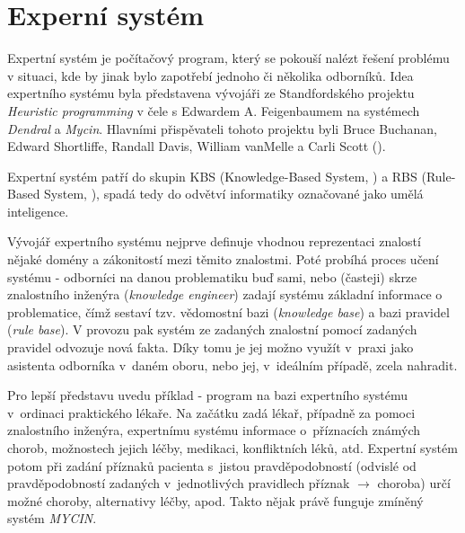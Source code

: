 \section{Experní systém}
Expertní systém je počítačový program, který se pokouší nalézt řešení problému
v situaci, kde by jinak bylo zapotřebí jednoho či několika odborníků.
Idea expertního systému byla představena vývojáři ze Standfordského projektu
\emph{Heuristic programming} v čele s Edwardem A. Feigenbaumem na systémech
\emph{Dendral} a \emph{Mycin}. Hlavními přispěvateli tohoto projektu byli
Bruce Buchanan, Edward Shortliffe, Randall Davis, William vanMelle a Carli
Scott (\cite{expert-system}).

Expertní systém patří do skupin KBS (Knowledge-Based System, ) a RBS (Rule-Based System, ), spadá tedy do odvětví informatiky označované jako umělá
inteligence.

Vývojář expertního systému nejprve definuje vhodnou reprezentaci znalostí nějaké
domény a zákonitostí mezi těmito znalostmi. Poté probíhá proces učení systému -
odborníci na danou problematiku buď sami, nebo (časteji) skrze znalostního
inženýra (\emph{knowledge engineer}) zadají systému základní informace
o problematice, čímž sestaví tzv. vědomostní bazi (\emph{knowledge base})
a bazi pravidel (\emph{rule base}). V provozu pak systém ze zadaných znalostní
pomocí zadaných pravidel odvozuje nová fakta. Díky tomu je jej možno využít
v~praxi jako asistenta odborníka v~daném oboru, nebo jej, v~ideálním případě,
zcela nahradit.

Pro lepší představu uvedu příklad - program na bazi expertního systému
v~ordinaci praktického lékaře. Na začátku zadá lékař, případně za pomoci
znalostního inženýra, expertnímu systému informace o~příznacích známých chorob,
možnostech jejich léčby, medikaci, konfliktních léků, atd. Expertní systém potom
při zadání příznaků pacienta s~jistou pravděpodobností (odvislé od
pravděpodobností zadaných v~jednotlivých pravidlech příznak $\rightarrow$
choroba) určí možné choroby, alternativy léčby, apod. Takto nějak právě
funguje zmíněný systém \emph{MYCIN}.
